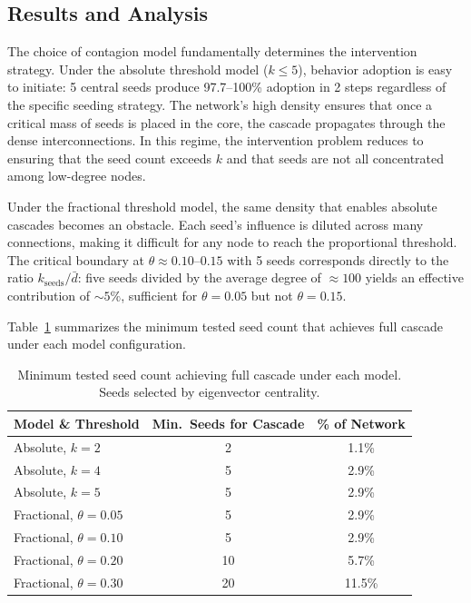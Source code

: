 \documentclass[12pt]{article}
\begin{document}
\subsection{Results and Analysis}

The choice of contagion model fundamentally determines the intervention strategy. Under the absolute threshold model ($k \leq 5$), behavior adoption is easy to initiate: 5 central seeds produce 97.7--100\% adoption in 2 steps regardless of the specific seeding strategy. The network's high density ensures that once a critical mass of seeds is placed in the core, the cascade propagates through the dense interconnections. In this regime, the intervention problem reduces to ensuring that the seed count exceeds $k$ and that seeds are not all concentrated among low-degree nodes.

Under the fractional threshold model, the same density that enables absolute cascades becomes an obstacle. Each seed's influence is diluted across many connections, making it difficult for any node to reach the proportional threshold. The critical boundary at $\theta \approx 0.10\text{--}0.15$ with 5 seeds corresponds directly to the ratio $k_{\text{seeds}} / \bar{d}$: five seeds divided by the average degree of ${\approx}100$ yields an effective contribution of ${\sim}5\%$, sufficient for $\theta = 0.05$ but not $\theta = 0.15$.

Table~\ref{tab:tradeoff} summarizes the minimum tested seed count that achieves full cascade under each model configuration.

\begin{table}[H]
\centering
\caption{Minimum tested seed count achieving full cascade under each model. Seeds selected by eigenvector centrality.}
\label{tab:tradeoff}
\begin{tabular}{lcc}
\toprule
Model \& Threshold & Min.\ Seeds for Cascade & \% of Network \\
\midrule
Absolute, $k = 2$ & 2 & 1.1\% \\
Absolute, $k = 4$ & 5 & 2.9\% \\
Absolute, $k = 5$ & 5 & 2.9\% \\
Fractional, $\theta = 0.05$ & 5 & 2.9\% \\
Fractional, $\theta = 0.10$ & 5 & 2.9\% \\
Fractional, $\theta = 0.20$ & 10 & 5.7\% \\
Fractional, $\theta = 0.30$ & 20 & 11.5\% \\
\bottomrule
\end{tabular}
\end{table}
\end{document}

